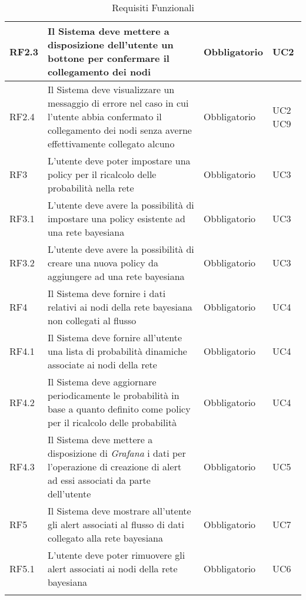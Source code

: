 \begin{center}
\begin{longtable}[c]{|m{}|m{}|m{}|m{}|}
\hline
RF2.3 & Il Sistema deve mettere a disposizione dell'utente un bottone per confermare il collegamento dei nodi & Obbligatorio & UC2\\
\hline
\rowcolor{grigio}RF2.4 & Il Sistema deve visualizzare un messaggio di errore nel caso in cui l'utente abbia confermato il collegamento dei nodi senza averne effettivamente collegato alcuno & Obbligatorio & UC2 UC9\\
\hline
RF3 & L'utente deve poter impostare una policy per il ricalcolo delle probabilità nella rete & Obbligatorio & UC3\\
\hline
\rowcolor{grigio}RF3.1 & L'utente deve avere la possibilità di impostare una policy esistente ad una rete bayesiana  & Obbligatorio & UC3\\ 
\hline
RF3.2 & L'utente deve avere la possibilità di creare una nuova policy da aggiungere ad una rete bayesiana & Obbligatorio & UC3\\
\hline
\rowcolor{grigio}RF4 & Il Sistema deve fornire i dati relativi ai nodi della rete bayesiana non collegati al flusso & Obbligatorio & UC4\\
\hline
RF4.1 & Il Sistema deve fornire all'utente una lista di probabilità dinamiche associate ai nodi della rete & Obbligatorio & UC4\\
\hline
\rowcolor{grigio}RF4.2 & Il Sistema deve aggiornare periodicamente le probabilità in base a quanto definito come policy per il ricalcolo delle probabilità & Obbligatorio & UC4\\
\hline
RF4.3 & Il Sistema deve mettere a disposizione di \textit{Grafana} i dati per l'operazione di creazione di alert ad essi associati da parte dell'utente & Obbligatorio & UC5\\
\hline
\rowcolor{grigio}RF5 & Il Sistema deve mostrare all'utente gli alert associati al flusso di dati collegato alla rete bayesiana & Obbligatorio & UC7\\ 
\hline
RF5.1 & L'utente deve poter rimuovere gli alert associati ai nodi della rete bayesiana & Obbligatorio & UC6\\ 
\hline
\caption{Requisiti Funzionali}
\end{longtable}
\end{center}



